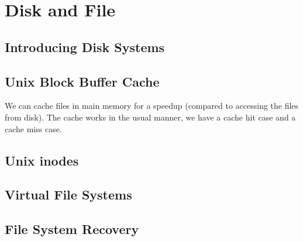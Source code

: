 
\chapter{Disk and File}


\section{Introducing Disk Systems}







\section{Unix Block Buffer Cache}

We can cache files in main memory for a speedup (compared to accessing the files 
from disk). The cache works in the usual manner, we have a cache hit case and a 
cache miss case.



\section{Unix inodes}

\section{Virtual File Systems}

\section{File System Recovery}